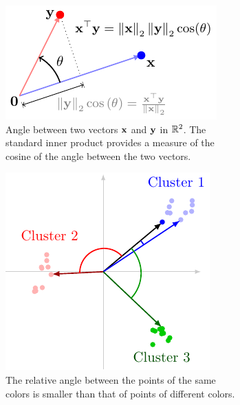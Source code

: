 \begin{figure}[h]
    \centering
    \begin{subfigure}[b]{0.45\textwidth}
        \includegraphics[width=0.95\linewidth]{figure/chapter01/angle-demo.pdf}
        \caption{Angle between two vectors $\mathbf{x}$ and $\mathbf{y}$ in $\mathbb{R}^2$. The standard inner product provides a measure of the cosine of the angle between the two vectors.}
        \label{fig:ch01-angle1}
    \end{subfigure}
    \hspace{0.05\textwidth}
    \begin{subfigure}[b]{0.4\textwidth}
        \centering
        \includegraphics[width=0.85\linewidth]{figure/chapter01/cluster-angle.pdf}
        \caption{The relative angle between the points of the same colors is smaller than that of points of different colors.}
        \label{fig:ch01-angle-clusters}
    \end{subfigure}
    \caption{}
\end{figure}


